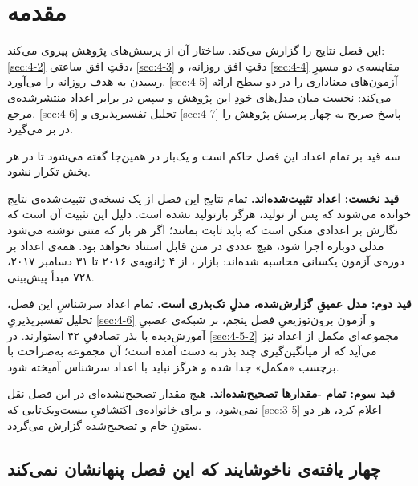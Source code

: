 
\section{مقدمه}
\label{sec:4-1}

این فصل نتایج را گزارش می‌کند. ساختار آن از پرسش‌های پژوهش پیروی می‌کند: \cref{sec:4-2} دقتِ
افق ساعتی، \cref{sec:4-3} دقتِ افق روزانه، و \cref{sec:4-4} مقایسه‌ی دو مسیرِ رسیدن به هدف روزانه را
می‌آورد. \cref{sec:4-5} آزمون‌های معناداری را در دو سطح ارائه می‌کند: نخست میان مدل‌های خودِ
این پژوهش و سپس در برابر اعداد منتشرشده‌ی مرجع. \cref{sec:4-6} تحلیل تفسیرپذیری و \cref{sec:4-7}
پاسخ صریح به چهار پرسش پژوهش را در بر می‌گیرد.

سه قید بر تمام اعداد این فصل حاکم است و یک‌بار در همین‌جا گفته می‌شود تا در هر بخش
تکرار نشود.

\textbf{قید نخست: اعداد تثبیت‌شده‌اند.} تمام نتایج این فصل از یک نسخه‌ی تثبیت‌شده‌ی
نتایج خوانده می‌شوند که پس از تولید، هرگز بازتولید نشده است. دلیل این تثبیت آن است که
نگارش بر اعدادی متکی است که باید ثابت بمانند؛ اگر هر بار که متنی نوشته می‌شود مدلی
دوباره اجرا شود، هیچ عددی در متن قابل استناد نخواهد بود. همه‌ی اعداد بر دوره‌ی آزمون
یکسانی محاسبه شده‌اند: بازار ، از ۴ ژانویه‌ی ۲۰۱۶ تا ۳۱ دسامبر ۲۰۱۷، ۷۲۸
مبدأ پیش‌بینی.

\textbf{قید دوم: مدل عمیقِ گزارش‌شده، مدلِ تک‌بذری است.} تمام اعداد سرشناسِ این فصل،
تحلیل تفسیرپذیریِ \cref{sec:4-6} و آزمون برون‌توزیعیِ فصل پنجم، بر شبکه‌ی عصبیِ آموزش‌دیده با
بذر تصادفیِ ۴۲ استوارند. در \cref{sec:4-5-2} مجموعه‌ای مکمل از اعداد نیز می‌آید که از
میانگین‌گیری چند بذر به دست آمده است؛ آن مجموعه به‌صراحت با برچسب «مکمل» جدا شده و
هرگز نباید با اعداد سرشناس آمیخته شود.

\textbf{قید سوم: تمام -مقدارها تصحیح‌شده‌اند.} هیچ مقدار تصحیح‌نشده‌ای در این
فصل نقل نمی‌شود، و برای خانواده‌ی اکتشافیِ بیست‌ویک‌تایی که \cref{sec:3-5} اعلام کرد، هر دو
ستونِ خام و تصحیح‌شده گزارش می‌گردد.

\subsection*{چهار یافته‌ی ناخوشایند که این فصل پنهانشان نمی‌کند}

